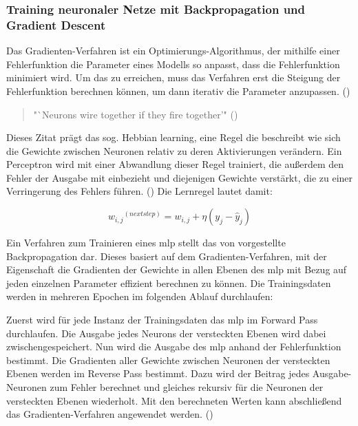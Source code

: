 \subsubsection{Training neuronaler Netze mit Backpropagation und Gradient Descent}
\label{chap:Training neuronaler Netze mit Backpropagation und Gradient Descent}

Das Gradienten-Verfahren ist ein Optimierungs-Algorithmus, der mithilfe einer Fehlerfunktion die Parameter eines Modells so anpasst, dass die Fehlerfunktion minimiert wird. Um das zu erreichen, muss das Verfahren erst die Steigung der Fehlerfunktion berechnen können, um dann iterativ die Parameter anzupassen. (\cite[vgl. S. 118]{Geron2019})

\begin{quote}
  "`Neurons wire together if they fire together'" (\cite{Lowel1992})
\end{quote}

Dieses Zitat prägt das sog. Hebbian learning, eine Regel die beschreibt wie sich die Gewichte zwischen Neuronen relativ zu deren Aktivierungen verändern. Ein Perceptron wird mit einer Abwandlung dieser Regel trainiert, die außerdem den Fehler der Ausgabe mit einbezieht und diejenigen Gewichte verstärkt, die zu einer Verringerung des Fehlers führen. (\cite[vgl. S. 289 ff.]{Geron2019}) Die Lernregel lautet damit:

\[{w_{i,j}}^{(next step)}=w_{i,j}+\eta(y_j-\hat{y}_j)\]

Ein Verfahren zum Trainieren eines \ac{mlp} stellt das von \cite{Rumelhart1986} vorgestellte Backpropagation dar. Dieses basiert auf dem Gradienten-Verfahren, mit der Eigenschaft die Gradienten der Gewichte in allen Ebenen des \ac{mlp} mit Bezug auf jeden einzelnen Parameter effizient berechnen zu können. Die Trainingsdaten werden in mehreren Epochen im folgenden Ablauf durchlaufen:

Zuerst wird für jede Instanz der Trainingsdaten das \ac{mlp} im Forward Pass durchlaufen. Die Ausgabe jedes Neurons der versteckten Ebenen wird dabei zwischengespeichert. Nun wird die Ausgabe des \ac{mlp} anhand der Fehlerfunktion bestimmt. Die Gradienten aller Gewichte zwischen Neuronen der versteckten Ebenen werden im Reverse Pass bestimmt. Dazu wird der Beitrag jedes Ausgabe-Neuronen zum Fehler berechnet und gleiches rekursiv für die Neuronen der versteckten Ebenen wiederholt. Mit den berechneten Werten kann abschließend das Gradienten-Verfahren angewendet werden. (\cite[S. 286]{Geron2019})
